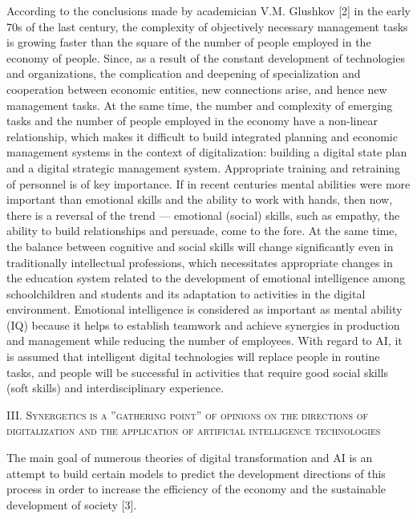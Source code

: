 \documentclass{article}
\begin{document}
\begin{multicols}{2}
According to the conclusions made by academician
V.M. Glushkov [2] in the early 70s of the last century, the
complexity of objectively necessary management tasks
is growing faster than the square of the number of
people employed in the economy of people. Since, as
a result of the constant development of technologies and
organizations, the complication and deepening of specialization and cooperation between economic entities, new
connections arise, and hence new management tasks. At
the same time, the number and complexity of emerging
tasks and the number of people employed in the economy
have a non-linear relationship, which makes it difficult
to build integrated planning and economic management
systems in the context of digitalization: building a digital
state plan and a digital strategic management system.
\setcounter{page}{27}
Appropriate training and retraining of personnel is of key
importance. If in recent centuries mental abilities were
more important than emotional skills and the ability to
work with hands, then now, there is a reversal of the
trend — emotional (social) skills, such as empathy, the
ability to build relationships and persuade, come to the
fore. At the same time, the balance between cognitive and
social skills will change significantly even in traditionally
intellectual professions, which necessitates appropriate
changes in the education system related to the development of emotional intelligence among schoolchildren
and students and its adaptation to activities in the digital
environment. Emotional intelligence is considered as
important as mental ability (IQ) because it helps to establish teamwork and achieve synergies in production and
management while reducing the number of employees.
With regard to AI, it is assumed that intelligent digital
technologies will replace people in routine tasks, and
people will be successful in activities that require good
social skills (soft skills) and interdisciplinary experience.
\begin{center}
\vspace{-5pt}
    \large{\textsc{III. Synergetics is a ”gathering point” of
opinions on the directions of digitalization
and the application of artificial intelligence
technologies}}
\vspace{-5pt}
\end{center}

The main goal of numerous theories of digital transformation and AI is an attempt to build certain models to predict the development directions of this process in order to increase the efficiency of the economy and the
sustainable development of society [3].


\end{multicols}
\end{document}
